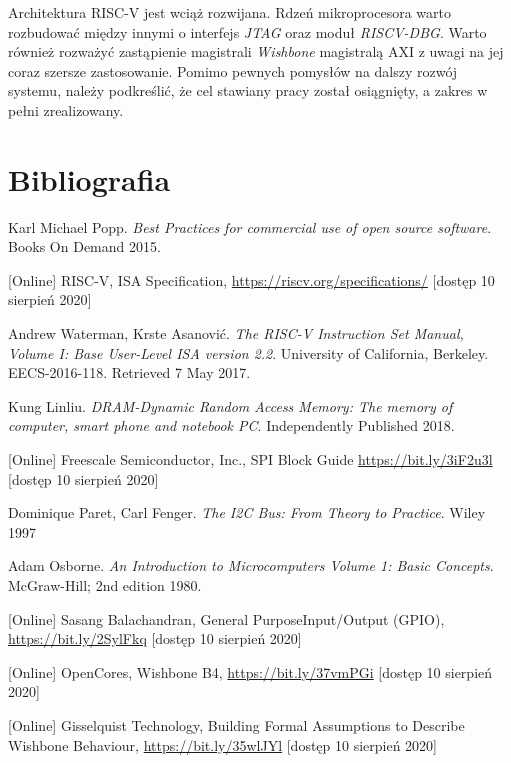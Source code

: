 \documentclass[11pt,a4paper]{article}
\begin{document}
Architektura RISC-V jest wciąż rozwijana. Rdzeń mikroprocesora warto rozbudować między innymi o interfejs \textit{JTAG} oraz moduł \textit{RISCV-DBG}. Warto również rozważyć zastąpienie magistrali \textit{Wishbone} magistralą AXI z uwagi na jej coraz szersze zastosowanie. Pomimo pewnych pomysłów na dalszy rozwój systemu, należy podkreślić, że cel stawiany pracy został osiągnięty, a zakres w pełni zrealizowany.

\newpage

\section{Bibliografia}

\begin{thebibliography}{10}

	 Karl Michael Popp. \textit{Best Practices for commercial use of open source software}. Books On Demand  2015.
	
	[Online] RISC-V, ISA Specification, \url{https://riscv.org/specifications/} [dostęp 10 sierpień 2020]
	
	 Andrew Waterman, Krste Asanović. \textit{The RISC-V Instruction Set Manual, Volume I: Base User-Level ISA version 2.2}. University of California, Berkeley. EECS-2016-118. Retrieved 7 May 2017.
	
	 Kung Linliu. \textit{DRAM-Dynamic Random Access Memory: The memory of computer, smart phone and notebook PC}. Independently Published 2018.
	
	[Online] Freescale Semiconductor, Inc., SPI Block Guide \url{https://bit.ly/3iF2u3l} [dostęp 10 sierpień 2020]
	
	 	Dominique Paret, Carl Fenger. \textit{The I2C Bus: From Theory to Practice}. Wiley 1997 
	
	 Adam Osborne. \textit{An Introduction to Microcomputers Volume 1: Basic Concepts}. McGraw-Hill; 2nd edition 1980.
	
	[Online] Sasang Balachandran, General PurposeInput/Output (GPIO),\\ \url{https://bit.ly/2SylFkq} [dostęp 10 sierpień 2020]
	
	[Online] OpenCores, Wishbone B4, \url{https://bit.ly/37vmPGi} [dostęp 10 sierpień 2020]
	
	[Online] Gisselquist Technology, Building Formal Assumptions to Describe Wishbone Behaviour, \url{https://bit.ly/35wlJYl} [dostęp 10 sierpień 2020]
	

\end{thebibliography}
\end{document}
